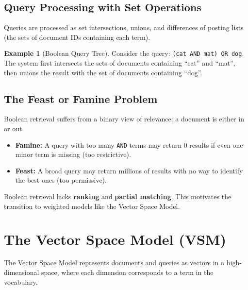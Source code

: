 \documentclass[11pt,a4paper]{article}
\theoremstyle{definition}
\newtheorem{example}{Example}[section]
\theoremstyle{plain}
\begin{document}
\subsection{Query Processing with Set Operations}

Queries are processed as set intersections, unions, and differences of posting lists (the sets of document IDs containing each term).

\begin{example}[Boolean Query Tree]
Consider the query: \texttt{(cat AND mat) OR dog}. The system first intersects the sets of documents containing ``cat'' and ``mat'', then unions the result with the set of documents containing ``dog''.

\begin{center}

\end{center}
\end{example}

\subsection{The Feast or Famine Problem}

Boolean retrieval suffers from a binary view of relevance: a document is either in or out.
\begin{itemize}
    \item \textbf{Famine:} A query with too many \texttt{AND} terms may return 0 results if even one minor term is missing (too restrictive).
    \item \textbf{Feast:} A broad query may return millions of results with no way to identify the best ones (too permissive).
\end{itemize}

\begin{keytakeaway}
Boolean retrieval lacks \textbf{ranking} and \textbf{partial matching}. This motivates the transition to weighted models like the Vector Space Model.
\end{keytakeaway}

\section{The Vector Space Model (VSM)}
\label{sec:vsm}

The Vector Space Model represents documents and queries as vectors in a high-dimensional space, where each dimension corresponds to a term in the vocabulary.
\end{document}
